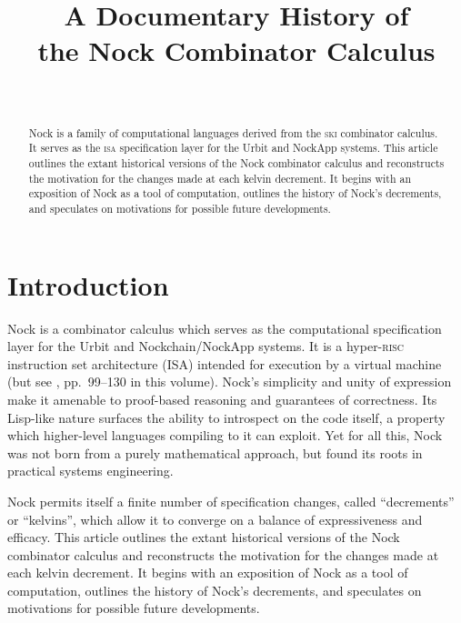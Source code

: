 \documentclass[twoside]{article}
\title{A Documentary History of \\ the Nock Combinator Calculus}
\author{\authorname \\ \affiliation}
\date{}
\begin{document}
\maketitle
\thispagestyle{firststyle}

\begin{abstract}
  Nock is a family of computational languages derived from the \textsc{ski} combinator calculus.  It serves as the \textsc{isa} specification layer for the Urbit and NockApp systems.  This article outlines the extant historical versions of the Nock combinator calculus and reconstructs the motivation for the changes made at each kelvin decrement.  It begins with an exposition of Nock as a tool of computation, outlines the history of Nock's decrements, and speculates on motivations for possible future developments.
\end{abstract}

\setcounter{page}{155}

\tableofcontents

\section{Introduction}

\sloppy
Nock is a combinator calculus which serves as the computational specification layer for the Urbit and Nockchain/NockApp systems.  It is a hyper-\textsc{risc} instruction set architecture (ISA) intended for execution by a virtual machine (but see , pp.~99–130 in this volume).  Nock's simplicity and unity of expression make it amenable to proof-based reasoning and guarantees of correctness.  Its Lisp-like nature surfaces the ability to introspect on the code itself, a property which higher-level languages compiling to it can exploit.  Yet for all this, Nock was not born from a purely mathematical approach, but found its roots in practical systems engineering.

Nock permits itself a finite number of specification changes, called ``decrements'' or ``kelvins'', which allow it to converge on a balance of expressiveness and efficacy.  This article outlines the extant historical versions of the Nock combinator calculus and reconstructs the motivation for the changes made at each kelvin decrement.  It begins with an exposition of Nock as a tool of computation, outlines the history of Nock's decrements, and speculates on motivations for possible future developments.
\end{document}
